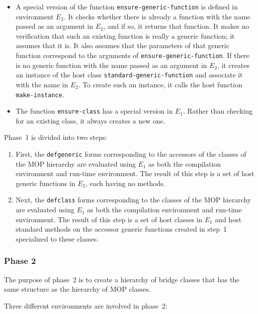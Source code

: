 \begin{itemize}
\item A special version of the function
  \texttt{ensure-generic-function} is defined in environment $E_2$.
  It checks whether there is already a function with the name passed
  as an argument in $E_2$, and if so, it returns that function.  It
  makes no verification that such an existing function is really a
  generic function; it assumes that it is.  It also assumes that the
  parameters of that generic function correspond to the arguments of
  \texttt{ensure-generic-function}.  If there is no generic function
  with the name passed as an argument in $E_2$, it creates an instance
  of the host class \texttt{standard-generic-function} and associate
  it with the name in $E_2$.  To create such an instance, it calls the
  host function \texttt{make-instance}.
\item The function \texttt{ensure-class} has a special version in
  $E_1$.  Rather than checking for an existing class, it always
  creates a new one.
\end{itemize}

Phase~1 is divided into two steps:

\begin{enumerate}
\item First, the \texttt{defgeneric} forms corresponding to the
  accessors of the classes of the MOP hierarchy are evaluated using
  $E_1$ as both the compilation environment and run-time environment.
  The result of this step is a set of host generic functions in $E_2$,
  each having no methods.
\item Next, the \texttt{defclass} forms corresponding to the classes
  of the MOP hierarchy are evaluated using $E_1$ as both the
  compilation environment and run-time environment.  The result of
  this step is a set of host classes in $E_1$ and host standard
  methods on the accessor generic functions created in step~1
  specialized to these classes.
\end{enumerate}

\subsubsection{Phase 2}

The purpose of phase~2 is to create a hierarchy of bridge classes that
has the same structure as the hierarchy of MOP classes.

Three different environments are involved in phase~2:

